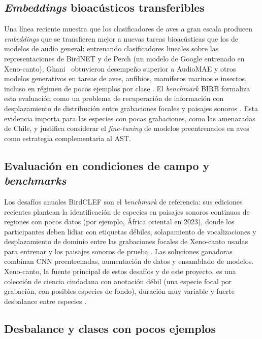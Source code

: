 \subsection*{\textit{Embeddings} bioacústicos transferibles}

Una línea reciente muestra que los clasificadores de aves a gran escala
producen \textit{embeddings} que se transfieren mejor a nuevas tareas
bioacústicas que los de modelos de audio general: entrenando clasificadores
lineales sobre las representaciones de BirdNET y de Perch (un modelo de
Google entrenado en Xeno-canto), Ghani \etal\ obtuvieron desempeño superior
a AudioMAE y otros modelos generativos en tareas de aves, anfibios,
mamíferos marinos e insectos, incluso en régimen de pocos ejemplos por clase
\citep{ghani2023embeddings}. El \textit{benchmark} BIRB formaliza esta
evaluación como un problema de recuperación de información con
desplazamiento de distribución entre grabaciones focales y paisajes sonoros
\citep{hamer2023birb}. Esta evidencia importa para las especies con pocas grabaciones, como las
amenazadas de Chile, y justifica considerar el \textit{fine-tuning} de
modelos preentrenados en aves como estrategia complementaria al AST.

\subsection*{Evaluación en condiciones de campo y \textit{benchmarks}}

Los desafíos anuales BirdCLEF son el \textit{benchmark} de referencia: sus ediciones recientes plantean la identificación de especies en
paisajes sonoros continuos de regiones con pocos datos (por ejemplo, África
oriental en 2023), donde los participantes deben lidiar con etiquetas
débiles, solapamiento de vocalizaciones y desplazamiento de dominio entre
las grabaciones focales de Xeno-canto usadas para entrenar y los paisajes
sonoros de prueba \citep{kahl2023birdclef}. Las soluciones ganadoras
combinan CNN preentrenadas, aumentación de datos y ensamblado de modelos.
Xeno-canto, la fuente principal de estos desafíos y de este proyecto, es una
colección de ciencia ciudadana con anotación débil (una especie focal por
grabación, con posibles especies de fondo), duración muy variable y fuerte
desbalance entre especies \citep{vellinga2015xenocanto}.

\subsection*{Desbalance y clases con pocos ejemplos}

